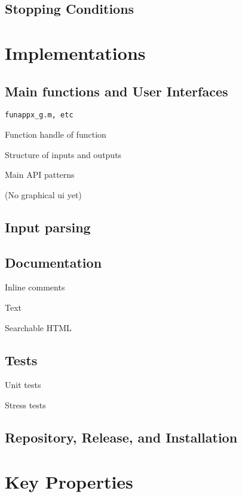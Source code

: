 \documentclass[acmtoms]{doc_acmtrans2m}%
\begin{document}
\subsection{Stopping Conditions}

\section{Implementations}
\label{sec:impl}


\subsection{Main functions and User Interfaces} \label{sec:ui}

 \texttt{funappx\_g.m, etc}

 Function handle of function

 Structure of inputs and outputs

 Main API patterns

 (No graphical ui yet)

\subsection{Input parsing}


\subsection{Documentation} \label{sec:doc}

  Inline comments

  Text

  Searchable HTML

\subsection{Tests} \label{sec:tests}


Unit tests

Stress tests


\subsection{Repository, Release, and Installation}


\section{Key Properties}\label{sec:prop}
\end{document}
